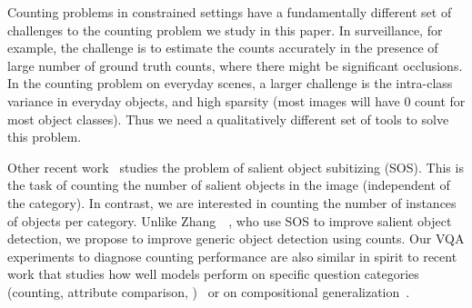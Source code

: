 \documentclass[10pt,twocolumn,letterpaper]{article}
\begin{document}
Counting problems in constrained settings have a fundamentally different set of challenges to the counting problem we study in this paper. In surveillance, for example, the challenge is to estimate the counts accurately in the presence of large number of ground truth counts, where there might be significant occlusions. In the counting problem on everyday scenes, a larger challenge is the intra-class variance in everyday objects, and high sparsity (most images will have 0 count for most object classes). Thus we need a qualitatively different set of tools to solve this problem.


Other recent work~\cite{zhang2015salient} studies the problem of salient object subitizing (SOS). This is the task of counting the number of salient objects in the image (independent of the category). In contrast, we are interested in counting the number of instances of objects per category. Unlike Zhang~\etal~\cite{zhang2015salient}, who use SOS to improve salient object detection, we propose to improve generic object detection using counts. Our VQA experiments to diagnose counting performance are also similar in spirit to recent work that studies how well models perform on specific question categories (counting, attribute comparison, \etc)~\cite{johnson_CVPR_17} or on compositional generalization~\cite{Agarwal_EMNLP_2016}.
\end{document}
